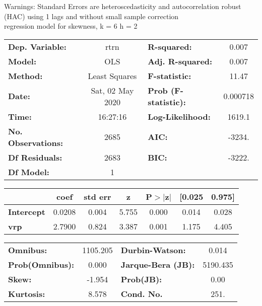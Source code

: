 Warnings: \newline
 [1] Standard Errors are heteroscedasticity and autocorrelation robust (HAC) using 1 lags and without small sample correction\\ 

regression model for skewness, k = 6 h = 2\begin{center}
\begin{tabular}{lclc}
\toprule
\textbf{Dep. Variable:}    &       rtrn       & \textbf{  R-squared:         } &     0.007   \\
\textbf{Model:}            &       OLS        & \textbf{  Adj. R-squared:    } &     0.007   \\
\textbf{Method:}           &  Least Squares   & \textbf{  F-statistic:       } &     11.47   \\
\textbf{Date:}             & Sat, 02 May 2020 & \textbf{  Prob (F-statistic):} &  0.000718   \\
\textbf{Time:}             &     16:27:16     & \textbf{  Log-Likelihood:    } &    1619.1   \\
\textbf{No. Observations:} &        2685      & \textbf{  AIC:               } &    -3234.   \\
\textbf{Df Residuals:}     &        2683      & \textbf{  BIC:               } &    -3222.   \\
\textbf{Df Model:}         &           1      & \textbf{                     } &             \\
\bottomrule
\end{tabular}
\begin{tabular}{lcccccc}
                   & \textbf{coef} & \textbf{std err} & \textbf{z} & \textbf{P$> |$z$|$} & \textbf{[0.025} & \textbf{0.975]}  \\
\midrule
\textbf{Intercept} &       0.0208  &        0.004     &     5.755  &         0.000        &        0.014    &        0.028     \\
\textbf{vrp}       &       2.7900  &        0.824     &     3.387  &         0.001        &        1.175    &        4.405     \\
\bottomrule
\end{tabular}
\begin{tabular}{lclc}
\textbf{Omnibus:}       & 1105.205 & \textbf{  Durbin-Watson:     } &    0.014  \\
\textbf{Prob(Omnibus):} &   0.000  & \textbf{  Jarque-Bera (JB):  } & 5190.435  \\
\textbf{Skew:}          &  -1.954  & \textbf{  Prob(JB):          } &     0.00  \\
\textbf{Kurtosis:}      &   8.578  & \textbf{  Cond. No.          } &     251.  \\
\bottomrule
\end{tabular}
\end{center}

